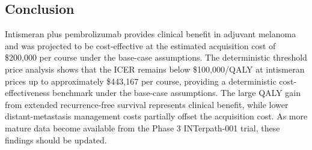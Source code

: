 \documentclass[12pt,a4paper]{article}
\begin{document}
\subsection{Conclusion}

Intismeran plus \mbox{pembrolizumab} provides clinical benefit in adjuvant melanoma and was projected to be cost-effective at the estimated acquisition cost of \$200,000 per course under the base-case assumptions. The deterministic threshold price analysis shows that the ICER remains below \$100,000/QALY at intismeran prices up to approximately \$443,167 per course, providing a deterministic cost-effectiveness benchmark under the base-case assumptions. The large QALY gain from extended recurrence-free survival represents clinical benefit, while lower distant-metastasis management costs partially offset the acquisition cost. As more mature data become available from the Phase 3 \mbox{INTerpath-001} trial, these findings should be updated.

\newpage

\end{document}
